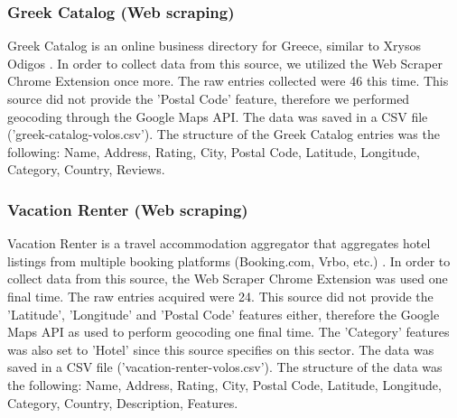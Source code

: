 \subsubsection{Greek Catalog (Web scraping)}

Greek Catalog is an online business directory for Greece, similar to Xrysos Odigos \cite{greek_catalog}. In order to collect data from this source, we utilized the Web Scraper Chrome Extension once more. The raw entries collected were 46 this time. This source did not provide the 'Postal Code' feature, therefore we performed geocoding through the Google Maps API. The data was saved in a CSV file ('greek-catalog-volos.csv'). The structure of the Greek Catalog entries was the following: Name, Address, Rating, City, Postal Code, Latitude, Longitude, Category, Country, Reviews.

\subsubsection{Vacation Renter (Web scraping)}

Vacation Renter is a travel accommodation aggregator that aggregates hotel listings from multiple booking platforms (Booking.com, Vrbo, etc.) \cite{vacation_renter}. In order to collect data from this source, the Web Scraper Chrome Extension was used one final time. The raw entries acquired were 24. This source did not provide the 'Latitude', 'Longitude' and 'Postal Code' features either, therefore the Google Maps API as used to perform geocoding one final time. The 'Category' features was also set to 'Hotel' since this source specifies on this sector. The data was saved in a CSV file ('vacation-renter-volos.csv'). The structure of the data was the following: Name, Address, Rating, City, Postal Code, Latitude, Longitude, Category, Country, Description, Features.

